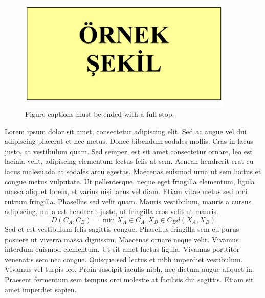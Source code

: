 \begin{figure}
	\centering
	\includegraphics[width=290pt,keepaspectratio=true]{./fig/sekil4}
	\caption{Figure captions must be ended with a full stop.}
	\label{fig:3-1-4}
\end{figure}

Lorem ipsum dolor sit amet, consectetur adipiscing elit. Sed ac augue vel dui 
adipiscing placerat et nec metus. Donec bibendum sodales mollis. Cras in lacus 
justo, at vestibulum quam. Sed semper, est sit amet consectetur ornare, leo est 
lacinia velit, adipiscing elementum lectus felis at sem. Aenean hendrerit erat eu 
lacus malesuada at sodales arcu egestas. Maecenas euismod urna ut sem luctus et 
congue metus vulputate. Ut pellentesque, neque eget fringilla elementum, ligula 
massa aliquet lorem, et varius nisi lacus vel diam. Etiam vitae metus sed orci 
rutrum fringilla. Phasellus sed velit quam. Mauris vestibulum, mauris a cursus 
adipiscing, nulla est hendrerit justo, ut fringilla eros velit ut mauris.
\begin{equation}
D\left(C_{A},C_{B}\right) = \min X_{A}\in C_{A},X_{B}\in C_{B} 
d\left(X_{A},X_{B}\right)  
\end{equation}
Sed et est vestibulum felis sagittis congue. Phasellus fringilla sem eu purus 
posuere ut viverra massa dignissim. Maecenas ornare neque velit. Vivamus interdum 
euismod elementum. Ut sit amet luctus ligula. Vivamus porttitor venenatis sem nec 
congue. Quisque sed lectus et nibh imperdiet vestibulum. Vivamus vel turpis leo. 
Proin suscipit iaculis nibh, nec dictum augue aliquet in. Praesent fermentum sem 
tempus orci molestie at facilisis dui sagittis. Etiam sit amet imperdiet sapien.

